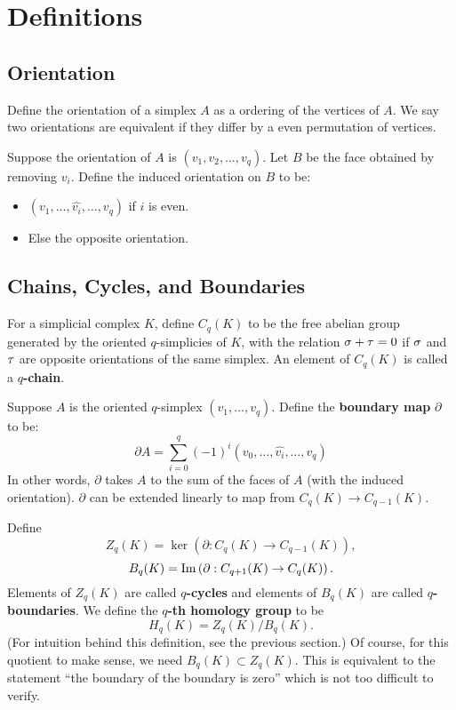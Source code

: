 \section{Definitions}

\subsection{Orientation}

Define the orientation of a simplex $A$ as a ordering of the vertices of $A$. We say two orientations are equivalent if they differ by a even permutation of vertices.

Suppose the orientation of $A$ is $(v_1, v_2, \dots, v_q)$. Let $B$ be the face obtained by removing $v_i$. Define the induced orientation on $B$ to be:
\begin{itemize}
    \item $(v_1, \dots, \hat{v_i}, \dots, v_q)$ if $i$ is even.
    \item Else the opposite orientation.
\end{itemize}

\subsection{Chains, Cycles, and Boundaries}

For a simplicial complex $K$, define $C_q(K)$ to be the free abelian group generated by the oriented $q$-simplicies of $K$, with the relation $\sigma + \tau = 0$ if $\sigma$ and $\tau$ are opposite orientations of the same simplex. An element of $C_q(K)$ is called a \textbf{$q$-chain}.

Suppose $A$ is the oriented $q$-simplex $(v_1, \dots, v_q)$. Define the \textbf{boundary map} $\partial$ to be:
\[
    \partial A = \sum_{i = 0}^q(-1)^i (v_0, \dots, \hat{v_i}, \dots, v_q)
\]
In other words, $\partial$ takes $A$ to the sum of the faces of $A$ (with the induced orientation). $\partial$ can be extended linearly to map from $C_q(K) \to C_{q-1}(K)$.

Define
\[
    Z_q(K) = \ker\left(\partial: C_q(K) \to C_{q-1}(K)\right),
\]
\[
    B_q(K) = \operatorname{Im}\left(\partial: C_{q+1}(K) \to C_q(K)\right).
\]
Elements of $Z_q(K)$ are called \textbf{$q$-cycles} and elements of $B_q(K)$ are called \textbf{$q$-boundaries}. We define the \textbf{$q$-th homology group} to be
\[
    H_q(K) = Z_q(K) / B_q(K).
\]
(For intuition behind this definition, see the previous section.) Of course, for this quotient to make sense, we need $B_q(K) \subset Z_q(K)$. This is equivalent to the statement ``the boundary of the boundary is zero'' which is not too difficult to verify.

